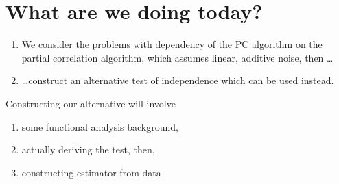 %
\begin{flushright}
\end{flushright}
	\vspace{-46.5mm}
	{\bfseries\Large{\color{ETHtitleblue}\ETHtitle}}\par
    \vspace{-3.5mm}
    \Large\ETHsubtitle
\clearpage
\vspace*{-16.5mm}
\tableofcontents
\clearpage

\section{What are we doing today?}
\begin{enumerate}
	\item We consider the problems with dependency of the PC algorithm on the partial correlation algorithm, which assumes linear, additive noise, then \ldots
	\item\ldots construct an alternative test of independence which can be used instead.
\end{enumerate}
\clearpage
Constructing our alternative will involve
\begin{enumerate}
	\item some functional analysis background,
	\item actually deriving the test, then,
	\item constructing estimator from data
\end{enumerate}
\clearpage

